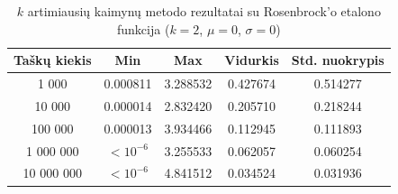 \begin{table}[H]
    \centering
    \begin{tabular}{|c|c|c|c|c|}
        \hline
        \textbf{Taškų kiekis} & \textbf{Min} & \textbf{Max} & \textbf{Vidurkis} & \textbf{Std. nuokrypis} \\ \hline
        1 000        & 0.000811 & 3.288532 & 0.427674 & 0.514277 \\ \hline
        10 000       & 0.000014 & 2.832420 & 0.205710 & 0.218244 \\ \hline
        100 000      & 0.000013 & 3.934466 & 0.112945 & 0.111893 \\ \hline
        1 000 000    & $<10^{-6}$ & 3.255533 & 0.062057 & 0.060254 \\ \hline
        10 000 000   & $<10^{-6}$ & 4.841512 & 0.034524 & 0.031936 \\ \hline
    \end{tabular}
    \caption{$k$ artimiausių kaimynų metodo rezultatai su Rosenbrock'o etalono funkcija ($k = 2$, $\mu = 0$, $\sigma = 0$)}
\end{table}